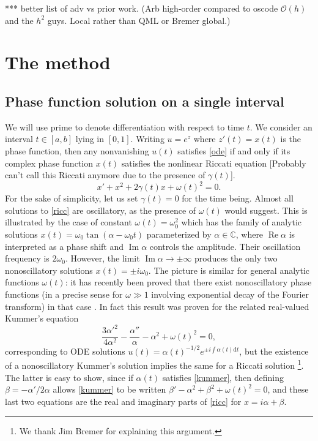 \documentclass[10pt]{article}
\newcommand{\be}{\begin{equation}}
\newcommand{\ee}{\end{equation}}
\newcommand{\C}{\mathbb{C}}
\renewcommand{\d}{\mathrm{d}} %
\newcommand{\bigO}{{\mathcal O}}
\DeclareMathOperator{\im}{Im}
\DeclareMathOperator{\re}{Re}
\newcommand{\om}{\omega}
\newcommand{\g}{\gamma}
\newcommand{\Fruzsi}[1]{{\color{blue}#1}}
\begin{document}
*** better list of adv vs prior work.
(Arb high-order compared to oscode $\bigO(h)$ and the $h^2$ guys.
Local rather than QML or Bremer global.)



\section{The method}

\subsection{Phase function solution on a single interval}

We will use prime to denote differentiation with respect to time $t$.
We consider an interval $t\in[a,b]$ lying in $[0,1]$.  
Writing $u = e^z$ where $z'(t) = x(t)$ is the phase function,
then any nonvanishing $u(t)$ satisfies \cref{ode} if and only if
its complex phase function $x(t)$ satisfies the nonlinear Riccati equation
\Fruzsi{[Probably can't call this Riccati anymore due to the presence of $\g(t)$].}
\be
x' + x^2 + 2\g(t)x + \om(t)^2 = 0.
\label{ricc}
\ee
\Fruzsi{For the sake of simplicity, let us set $\g(t) = 0$ for the time being.}
Almost all solutions to \cref{ricc} are oscillatory,
as the presence of $\om(t)$ would suggest.
This is illustrated by the case of constant $\om(t) = \om_0^2$ 
which has the family of analytic solutions
$x(t) = \om_0 \tan(\alpha - \om_0t)$ parameterized by $\alpha\in\C$,
where $\re \alpha$ is interpreted as a phase shift and $\im \alpha$
controls the amplitude. Their oscillation frequency is $2\om_0$.
However, the limit $\im \alpha \to \pm \infty$ produces
the only two nonoscillatory solutions $x(t) = \pm i\om_0$.
The picture is similar
for general analytic functions $\om(t)$:
it has recently been proved that there exist nonoscillatory phase functions
(in a precise sense for $\om\gg 1$ involving exponential decay of the Fourier
transform) in that case \cite{Heit15,Brem16}.
In fact this result was proven
for the related real-valued Kummer's equation
\be
\frac{3 \alpha'^2}{4\alpha^2} - \frac{\alpha''}{\alpha} - \alpha^2 +
\om(t)^2 = 0,
\label{kummer}
\ee
corresponding to ODE solutions $u(t) = \alpha(t)^{-1/2} e^{\pm i\int \alpha(t) \d t}$,
but the existence of a nonoscillatory Kummer's solution implies the same for
a Riccati solution \footnote{We thank Jim Bremer for explaining this argument.}.
The latter is easy to show, since if $\alpha(t)$ satisfies \cref{kummer},
then defining $\beta = -\alpha'/2\alpha$ allows \cref{kummer}
to be written
$\beta' - \alpha^2 + \beta^2 + \om(t)^2 = 0$, and these last two equations
are the real and imaginary parts of \cref{ricc}
for $x = i\alpha + \beta$.
\end{document}
